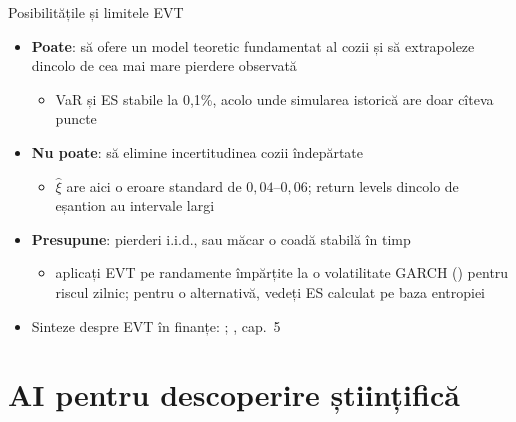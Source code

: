 \begin{frame}{Posibilitățile și limitele EVT}
\itemsize{\small}
\begin{itemize}
    \item \textbf{Poate}: să ofere un model teoretic fundamentat al cozii și să extrapoleze dincolo de cea mai mare pierdere observată
    \begin{itemize}
        \item VaR și ES stabile la 0,1\%, acolo unde simularea istorică are doar cîteva puncte
    \end{itemize}
    \item \textbf{Nu poate}: să elimine incertitudinea cozii îndepărtate
    \begin{itemize}
        \item $\hat\xi$ are aici o eroare standard de $0{,}04$--$0{,}06$; return levels dincolo de eșantion au intervale largi
    \end{itemize}
    \item \textbf{Presupune}: pierderi i.i.d., sau măcar o coadă stabilă în timp
    \begin{itemize}
        \item aplicați EVT pe randamente împărțite la o volatilitate GARCH () pentru riscul zilnic; pentru o alternativă, vedeți ES calculat pe baza entropiei 
    \end{itemize}
    \item Sinteze despre EVT în finanțe: ; , cap.~5
\end{itemize}
\end{frame}


\section{AI pentru descoperire științifică}

